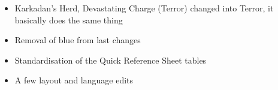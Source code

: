 

\subtitle{beta 2.2.1}

\begin{itemize}
\item Karkadan's Herd, Devastating Charge (Terror) changed into Terror, it basically does the same thing
\item Removal of blue from last changes
\item Standardisation of the Quick Reference Sheet tables
\item A few layout and language edits
\end{itemize}

